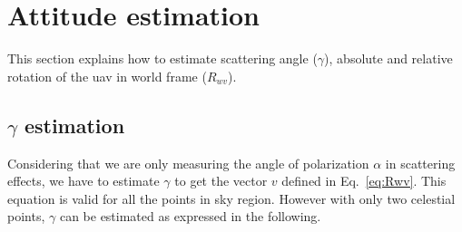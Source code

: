 \graphicspath{{./content/intro/figures/}}

\section{Attitude estimation}
\label{sec:g-abs-rel}
This section explains how to estimate scattering angle ($\gamma$), absolute and
relative rotation of the \gls{uav} in world frame ($R_{wv}$).

\subsection{$\gamma$ estimation}
\label{sec:gamma}
Considering that we are only measuring the angle of polarization $\alpha$
in scattering effects, we have to estimate $\gamma$ to get the vector
$v$ defined in Eq.~\ref{eq:Rwv}. This equation is valid for all the points in
sky region. However with only two celestial points, $\gamma$ can be estimated as
expressed in the following.

